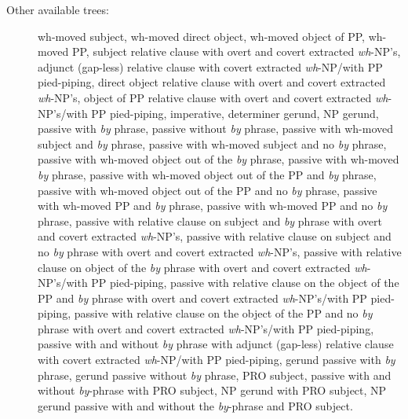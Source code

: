 \begin{description}
\item[Other available trees:] wh-moved subject, wh-moved direct object,
wh-moved object of PP, wh-moved PP, subject relative clause with overt and
covert extracted {\it wh}-NP's, adjunct (gap-less) relative clause with
covert extracted {\it wh}-NP/with PP pied-piping, direct object relative
clause with overt and covert extracted {\it wh}-NP's, object of PP relative
clause with overt and covert extracted {\it wh}-NP's/with PP pied-piping,
imperative, determiner gerund, NP gerund, passive with {\it by} phrase,
passive without {\it by} phrase, passive with wh-moved subject and {\it by}
phrase, passive with wh-moved subject and no {\it by} phrase, passive with
wh-moved object out of the {\it by} phrase, passive with wh-moved {\it by}
phrase, passive with wh-moved object out of the PP and {\it by} phrase,
passive with wh-moved object out of the PP and no {\it by} phrase, passive
with wh-moved PP and {\it by} phrase, passive with wh-moved PP and no {\it
by} phrase, passive with relative clause on subject and {\it by} phrase
with overt and covert extracted {\it wh}-NP's, passive with relative clause
on subject and no {\it by} phrase with overt and covert extracted {\it
wh}-NP's, passive with relative clause on object of the {\it by} phrase
with overt and covert extracted {\it wh}-NP's/with PP pied-piping, passive
with relative clause on the object of the PP and {\it by} phrase with overt
and covert extracted {\it wh}-NP's/with PP pied-piping, passive with
relative clause on the object of the PP and no {\it by} phrase with overt
and covert extracted {\it wh}-NP's/with PP pied-piping, passive with and
without {\it by} phrase with adjunct (gap-less) relative clause with covert
extracted {\it wh}-NP/with PP pied-piping, gerund passive with {\it by}
phrase, gerund passive without {\it by} phrase, PRO subject, passive with
and without {\it by}-phrase with PRO subject, NP gerund with PRO subject,
NP gerund passive with and without the {\it by}-phrase and PRO subject.

\end{description}


